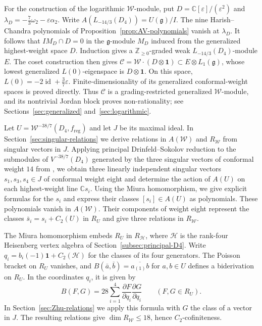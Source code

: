\documentclass[11pt]{amsart}
\numberwithin{equation}{section}
\theoremstyle{definition}
\theoremstyle{remark}
\newcommand{\CC}{\mathbb C}
\newcommand{\g}{\mathfrak g}
\newcommand{\one}{\mathbf1}
\newcommand{\W}{\mathcal W}
\newcommand{\reg}{\mathrm{reg}}
\newcommand{\id}{\operatorname{id}}
\begin{document}
For the construction of the logarithmic $\mathcal W$-module, put
$D=\CC[\varepsilon]/(\varepsilon^2)$ and
$\lambda_D=-\frac73\omega_2-\varepsilon\alpha_2$.
Write $A(L_{-14/3}(D_4))=U(\g)/I$. The nine Harish--Chandra
polynomials of Proposition~\ref{prop:AV-polynomials} vanish at $\lambda_D$.
It follows that $IM_D\cap D=0$ in the $\g$-module $M_D$ induced
from the generalized highest-weight space $D$.
Induction gives a $\mathbb Z_{\geq 0}$-graded weak $L_{-14/3}(D_4)$-module $E$.
The coset construction then gives
$\mathcal C=\mathcal W\cdot(D\otimes\one)\subset E\otimes L_1(\g)$,
whose lowest generalized $L(0)$-eigenspace is $D\otimes\one$.
On this space, $L(0)=-2\id+\frac37\varepsilon$.
Finite-dimensionality of its generalized conformal-weight
spaces is proved directly. Thus $\mathcal C$ is a
grading-restricted generalized $\mathcal W$-module, and its
nontrivial Jordan block proves non-rationality; see
Sections~\ref{sec:generalized} and~\ref{sec:logarithmic}.

Let $U=\W^{-38/7}(D_4,f_{\reg})$ and let $J$ be its maximal ideal.
In Section~\ref{sec:singular-relations} we derive relations in
$A(\mathcal W)$ and $R_{\mathcal W}$ from singular vectors in $J$.
Applying principal Drinfeld--Sokolov reduction to the submodules of
$V^{-38/7}(D_4)$ generated by the three singular vectors of conformal
weight $14$ from \cite[Theorem~1.2(5)]{JS}, we obtain three linearly
independent singular vectors $s_1,s_3,s_4\in J$ of conformal weight eight
and determine the action of $A(U)$ on each highest-weight line $\CC s_i$.
Using the Miura homomorphism, we give explicit formulas for the $s_i$
and express their classes $[s_i]\in A(U)$ as polynomials. These
polynomials vanish in $A(\mathcal W)$. Their components of weight eight
represent the classes $\bar s_i=s_i+C_2(U)$ in $R_U$ and give three
relations in $R_{\mathcal W}$.

The Miura homomorphism embeds $R_U$ in $R_{\mathcal H}$, where
$\mathcal H$ is the rank-four Heisenberg vertex algebra of
Section~\ref{subsec:principal-D4}. Write $q_i=b_i(-1)\one+C_2(\mathcal H)$
for the classes of its four generators. The Poisson bracket on $R_U$
vanishes, and $B(\bar a,\bar b)=\overline{a_{(1)}b}$ for $a,b\in U$
defines a biderivation on $R_U$. In the coordinates $q_i$, it is given by
\[
 B(F,G)=28\sum_{i=1}^4
 \frac{\partial F}{\partial q_i}\frac{\partial G}{\partial q_i}
 \qquad(F,G\in R_U).
\]
In Section~\ref{sec:Zhu-relations} we apply this formula with $G$ the
class of a vector in $J$. The resulting relations give
$\dim R_{\mathcal W}\le18$, hence $C_2$-cofiniteness.
\end{document}

